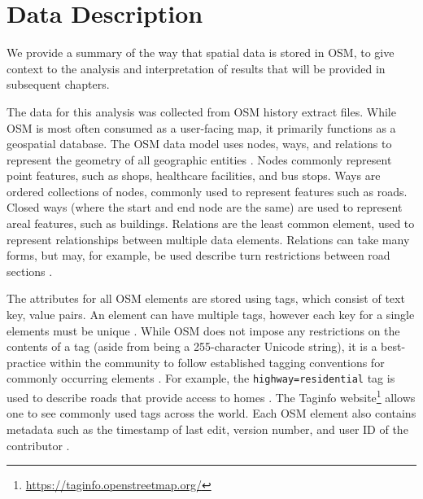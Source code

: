 \chapter{Data Description}
\label{chapterlabel3}
We provide a summary of the way that spatial data is stored in OSM, to give context to the analysis and interpretation of results that will be provided in subsequent chapters.

The data for this analysis was collected from OSM history extract files. While OSM is most often consumed as a user-facing map, it primarily functions as a geospatial database. The OSM data model uses nodes, ways, and relations to represent the geometry of all geographic entities \parencite{noauthor_elements_2020}. Nodes commonly represent point features, such as shops, healthcare facilities, and bus stops. Ways are ordered collections of nodes, commonly used to represent features such as roads. Closed ways (where the start and end node are the same) are used to represent areal features, such as buildings. Relations are the least common element, used to represent relationships between multiple data elements. Relations can take many forms, but may, for example, be used describe turn restrictions between road sections \parencite{noauthor_elements_2020}. 

The attributes for all OSM elements are stored using tags, which consist of text key, value pairs. An element can have multiple tags, however each key for a single elements must be unique \parencite{noauthor_tags_2020}. While OSM does not impose any restrictions on the contents of a tag (aside from being a 255-character Unicode string), it is a best-practice within the community to follow established tagging conventions for commonly occurring elements \parencite{noauthor_tags_2020}. For example, the \texttt{highway=residential} tag is used to describe roads that provide access to homes \parencite{noauthor_elements_2020}. The Taginfo website\footnote{\url{https://taginfo.openstreetmap.org/}} allows one to see commonly used tags across the world. Each OSM element also contains metadata such as the timestamp of last edit, version number, and user ID of the contributor \parencite{noauthor_elements_2020}. 

